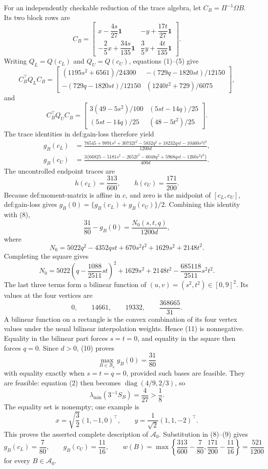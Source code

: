For an independently checkable reduction of the trace algebra, let \(C_B=\Pi^{-1}\Omega B\).  Its two block rows are
\[
 C_B=
 \begin{bmatrix}
 x-\dfrac{4s}{27}\mathbf1&-y+\dfrac{17t}{27}\mathbf1\\[3pt]
 -\dfrac25x+\dfrac{34s}{135}\mathbf1&\dfrac35y+\dfrac{4t}{135}\mathbf1
 \end{bmatrix}.
 \tag{5}
\]
Writing \(Q_L=Q(c_L)\) and \(Q_U=Q(c_U)\), equations (1)--(5) give
\[
 C_B^{\top}Q_LC_B=
 \begin{bmatrix}
 (1195s^2+6561)/24300&-(729q-1820st)/12150\\
 -(729q-1820st)/12150&(1240t^2+729)/6075
 \end{bmatrix},
 \tag{6}
\]
and
\[
 C_B^{\top}Q_UC_B=
 \begin{bmatrix}
 3(49-5s^2)/100&(5st-14q)/25\\
 (5st-14q)/25&(48-5t^2)/25
 \end{bmatrix}.
 \tag{7}
\]
The trace identities in def:gain-loss therefore yield
\[
 \begin{split}
 g_B(c_L)
 &=\frac{76545+9891s^2+30732t^2-5832q^2+18232qst-10460s^2t^2}{1200d},\\
 g_B(c_U)
 &=\frac{3\{66825-5181s^2-2652t^2-6048q^2+5968qst-1260s^2t^2\}}{400d}.
 \end{split}
 \tag{8}
\]
The uncontrolled endpoint traces are
\[
 h(c_L)=\frac{313}{600},
 \qquad
 h(c_U)=\frac{171}{200}.
 \tag{9}
\]
Because def:moment-matrix is affine in \(c\), and zero is the midpoint of \([c_L,c_U]\), def:gain-loss gives \(g_B(0)=\{g_B(c_L)+g_B(c_U)\}/2\).  Combining this identity with (8),
\[
 \frac{31}{80}-g_B(0)=\frac{N_0(s,t,q)}{1200d},
 \tag{10}
\]
where
\[
 N_0=5022q^2-4352qst+670s^2t^2+1629s^2+2148t^2.
\]
Completing the square gives
\[
 N_0
 =5022\left(q-\frac{1088}{2511}st\right)^2
 +1629s^2+2148t^2-\frac{685118}{2511}s^2t^2.
 \tag{11}
\]
The last three terms form a bilinear function of \((u,v)=(s^2,t^2)\in[0,9]^2\).  Its values at the four vertices are
\[
 0,
 \qquad14661,
 \qquad19332,
 \qquad\frac{368665}{31}.
\]
A bilinear function on a rectangle is the convex combination of its four vertex values under the usual bilinear interpolation weights.  Hence (11) is nonnegative.  Equality in the bilinear part forces \(s=t=0\), and equality in the square then forces \(q=0\).  Since \(d>0\), (10) proves
\[
 \max_{B\in\mathcal B_\kappa}g_B(0)=\frac{31}{80}
\]
with equality exactly when \(s=t=q=0\), provided such bases are feasible.  They are feasible: equation (2) then becomes \(\operatorname{diag}(4/9,2/3)\), so
\[
 \lambda_{\min}(3^{-1}S_B)=\frac4{27}>\frac18.
 \tag{12}
\]
The equality set is nonempty; one example is
\[
 x=\sqrt{\frac32}(1,-1,0)^{\top},
 \qquad
 y=\frac1{\sqrt2}(1,1,-2)^{\top}.
\]
This proves the asserted complete description of \(\mathcal A_0\).  Substitution in (8)--(9) gives
\[
 g_B(c_L)=\frac7{80},
 \qquad
 g_B(c_U)=\frac{11}{16},
 \qquad
 w(B)=\max\left\{\frac{313}{600}-\frac7{80},
 \frac{171}{200}-\frac{11}{16}\right\}
 =\frac{521}{1200}
 \tag{13}
\]
for every \(B\in\mathcal A_0\).

